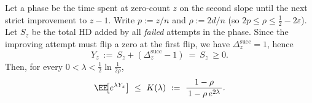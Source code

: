 %

\begin{lemma}\label{lem:phase-mgf}
	Let a phase be the time spent at zero-count $z$ on the second slope until the next strict improvement to $z-1$.
	Write $p:=z/n$ and $\rho:=2d/n$ (so $2p\le \rho \le \tfrac12-2\varepsilon$).
	Let $S_z$ be the total HD added by all \emph{failed} attempts in the phase.
	Since the improving attempt must flip a zero at the first flip, we have $\Delta^{\mathrm{succ}}_z=1$, hence
	\[
	Y_z\ :=\ S_z+(\Delta^{\mathrm{succ}}_z-1)\ =\ S_z\ \ge 0.
	\]
	Then, for every $0<\lambda<\tfrac12\ln\frac{1}{2\rho}$,
	\[
	\EE\!\big[e^{\lambda Y_z}\big]\ \le\ K(\lambda)\ :=\ \frac{1-\rho}{\,1-\rho\,e^{2\lambda}\,}.
	\]
\end{lemma}

